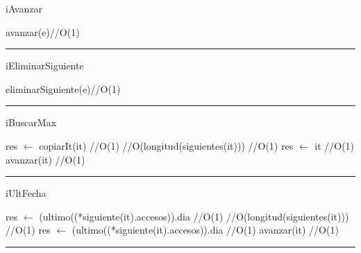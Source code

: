 
\begin{algorithm}[H]
\caption{iAvanzar}
\begin{algorithmic}[1]
\state avanzar(e)\hfill //O(1)
\EndFunction 
\end{algorithmic}
\hrule
{}
\end{algorithm}

\begin{algorithm}[H]
\caption{iEliminarSiguiente}
\begin{algorithmic}[1]
\state eliminarSiguiente(e)\hfill //O(1)
\EndFunction 
\end{algorithmic}
\hrule
{}
\end{algorithm}

\begin{algorithm}[H]
\caption{iBuscarMax}
\begin{algorithmic}[1]
\state res $\gets$ copiarIt(it) \hfill //O(1)
 \hfill //O(longitud(siguientes(it)))
 \hfill //O(1)
\state res $\gets$ it \hfill //O(1)
\endif
\state avanzar(it) \hfill //O(1)
\endwhile
\EndFunction 
\end{algorithmic}
\hrule
{}
\end{algorithm}

\begin{algorithm}[H]
\caption{iUltFecha}
\begin{algorithmic}[1]
\state res $\gets$ (ultimo((*siguiente(it).accesos)).dia \hfill //O(1)
 \hfill //O(longitud(siguientes(it)))
 \hfill //O(1)
\state res $\gets$ (ultimo((*siguiente(it).accesos)).dia \hfill //O(1)
\endif
\state avanzar(it) \hfill //O(1)
\endwhile
\EndFunction 
\end{algorithmic}
\hrule
{}
\end{algorithm}

